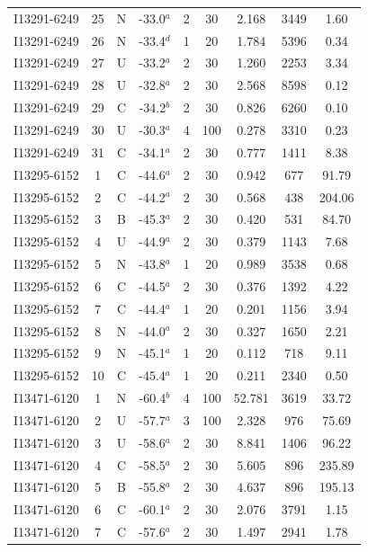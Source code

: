 \begin{table}
\begin{tabular}{ccccccccc}
I13291-6249 & 25 & N & -33.0$^{a}$ & 2 & 30 & 2.168 & 3449 & 1.60 \\
I13291-6249 & 26 & N & -33.4$^{d}$ & 1 & 20 & 1.784 & 5396 & 0.34 \\
I13291-6249 & 27 & U & -33.2$^{a}$ & 2 & 30 & 1.260 & 2253 & 3.34 \\
I13291-6249 & 28 & U & -32.8$^{a}$ & 2 & 30 & 2.568 & 8598 & 0.12 \\
I13291-6249 & 29 & C & -34.2$^{b}$ & 2 & 30 & 0.826 & 6260 & 0.10 \\
I13291-6249 & 30 & U & -30.3$^{a}$ & 4 & 100 & 0.278 & 3310 & 0.23 \\
I13291-6249 & 31 & C & -34.1$^{a}$ & 2 & 30 & 0.777 & 1411 & 8.38 \\
I13295-6152 & 1 & C & -44.6$^{a}$ & 2 & 30 & 0.942 & 677 & 91.79 \\
I13295-6152 & 2 & C & -44.2$^{a}$ & 2 & 30 & 0.568 & 438 & 204.06 \\
I13295-6152 & 3 & B & -45.3$^{a}$ & 2 & 30 & 0.420 & 531 & 84.70 \\
I13295-6152 & 4 & U & -44.9$^{a}$ & 2 & 30 & 0.379 & 1143 & 7.68 \\
I13295-6152 & 5 & N & -43.8$^{a}$ & 1 & 20 & 0.989 & 3538 & 0.68 \\
I13295-6152 & 6 & C & -44.5$^{a}$ & 2 & 30 & 0.376 & 1392 & 4.22 \\
I13295-6152 & 7 & C & -44.4$^{a}$ & 1 & 20 & 0.201 & 1156 & 3.94 \\
I13295-6152 & 8 & N & -44.0$^{a}$ & 2 & 30 & 0.327 & 1650 & 2.21 \\
I13295-6152 & 9 & N & -45.1$^{a}$ & 1 & 20 & 0.112 & 718 & 9.11 \\
I13295-6152 & 10 & C & -45.4$^{a}$ & 1 & 20 & 0.211 & 2340 & 0.50 \\
I13471-6120 & 1 & N & -60.4$^{b}$ & 4 & 100 & 52.781 & 3619 & 33.72 \\
I13471-6120 & 2 & U & -57.7$^{a}$ & 3 & 100 & 2.328 & 976 & 75.69 \\
I13471-6120 & 3 & U & -58.6$^{a}$ & 2 & 30 & 8.841 & 1406 & 96.22 \\
I13471-6120 & 4 & C & -58.5$^{a}$ & 2 & 30 & 5.605 & 896 & 235.89 \\
I13471-6120 & 5 & B & -55.8$^{a}$ & 2 & 30 & 4.637 & 896 & 195.13 \\
I13471-6120 & 6 & C & -60.1$^{a}$ & 2 & 30 & 2.076 & 3791 & 1.15 \\
I13471-6120 & 7 & C & -57.6$^{a}$ & 2 & 30 & 1.497 & 2941 & 1.78 \\

\end{tabular}
\end{table}
